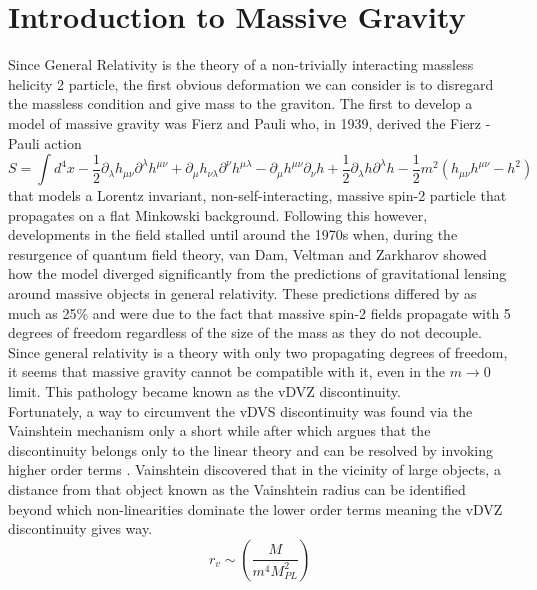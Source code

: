 \documentclass[11pt]{report}
\numberwithin{equation}{chapter}
\begin{document}
\section{Introduction to Massive Gravity}
Since General Relativity is the theory of a non-trivially interacting massless helicity 2 particle, the first obvious deformation we can consider is to disregard the massless condition and give mass to the graviton. The first to develop a model of massive gravity was Fierz and Pauli who, in 1939, derived the Fierz -Pauli action\cite{fierz1939relativistic}
\begin{equation}
    S = \int d^4 x- \frac{1}{2}\partial_{\lambda}h_{\mu\nu}\partial^{\lambda}h^{\mu\nu} + \partial_{\mu}h_{\nu\lambda}\partial^{\nu}h^{\mu\lambda} -\partial_{\mu}h^{\mu\nu}\partial_{\nu}h +\frac{1}{2}\partial_{\lambda}h\partial^{\lambda}h - \frac{1}{2}m^2\left(h_{\mu\nu}h^{\mu\nu}-h^2\right)
\end{equation}
that models a Lorentz invariant, non-self-interacting, massive spin-2 particle that propagates on a flat Minkowski background. Following this however, developments in the field stalled until around the 1970s when, during the resurgence of quantum field theory, van Dam, Veltman and Zarkharov showed how the model diverged significantly from the predictions of gravitational lensing around massive objects in general relativity\cite{Kurts_review}. These predictions differed by as much as 25\% and were due to the fact that massive spin-2 fields propagate with 5 degrees of freedom regardless of the size of the mass\cite{de_Rham_2014} as they do not decouple. Since general relativity is a theory with only two propagating degrees of freedom\cite{de_Rham_2014}, it seems that massive gravity cannot be compatible with it, even in the $m \longrightarrow 0$ limit. This pathology became known as the vDVZ discontinuity\cite{Kurts_review}. \\
Fortunately, a way to circumvent the vDVS discontinuity was found via the Vainshtein mechanism only a short while after which argues that the discontinuity belongs only to the linear theory and can be resolved by invoking higher order terms\cite{VAINSHTEIN1972393} \cite{Babichev_2013}. Vainshtein discovered that in the vicinity of large objects, a distance from that object known as the Vainshtein radius can be identified beyond which non-linearities dominate the lower order terms meaning the vDVZ discontinuity gives way. 
\begin{equation}
    r_v \sim \left(\frac{M}{m^4M^2_{PL}}\right)
\end{equation}
\end{document}
